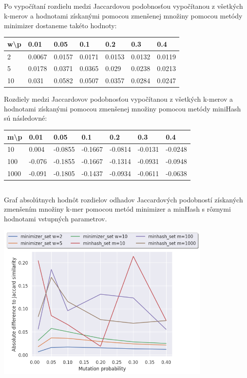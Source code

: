 \documentclass[a4paper]{article}
\begin{document}
\subsection{}

Po vypočítaní rozdielu medzi Jaccardovou podobnosťou vypočítanou z všetkých k-merov a hodnotami získanými pomocou zmenšenej množiny pomocou metódy minimizer dostaneme takéto hodnoty:

\begin{table}[!h]
	\begin{tabular}{|l|l|l|l|l|l|l|}
		\hline
		w\textbackslash p & 0.01   & 0.05   & 0.1    & 0.2    & 0.3    & 0.4   \\ \hline
		2 & 0.0067 & 0.0157 & 0.0171 & 0.0153 & 0.0132 & 0.0119 \\ \hline
		5 & 0.0178 & 0.0371 & 0.0365 & 0.029 & 0.0238 & 0.0213 \\ \hline
		10 & 0.031 & 0.0582 & 0.0507 & 0.0357 & 0.0284 & 0.0247 \\ \hline
		
	\end{tabular}
\end{table}

Rozdiely medzi Jaccardovov podobnosťou vypočítanou z všetkých k-merov a hodnotami získanými pomocou zmenšenej množiny pomocou metódy miniHash sú následovné:
 

\begin{table}[!h]
	\begin{tabular}{|l|l|l|l|l|l|l|}
		\hline
		m\textbackslash p & 0.01   & 0.05   & 0.1    & 0.2    & 0.3    & 0.4   \\ \hline
		10 & 0.004 & -0.0855 & -0.1667 & -0.0814 & -0.0131 & -0.0248 \\ \hline
		100 & -0.076 & -0.1855 & -0.1667 & -0.1314 & -0.0931 & -0.0948 \\ \hline
		1000 & -0.091 & -0.1805 & -0.1437 & -0.0934 & -0.0611 & -0.0638 \\ \hline
		
	\end{tabular}
\end{table}

\subsection{}
Graf absolútnych hodnôt rozdielov odhadov Jaccardových podobností získaných zmenšením množiny k-mer pomocou metód minimizer a minHash s rôznymi hodnotami vstupných parametrov. 
\centerline{\includegraphics[width=0.8\textwidth]{download}}
\end{document}
